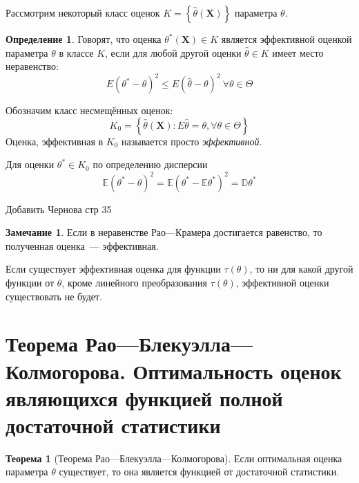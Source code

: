 \documentclass[oneside,final,14pt]{extreport}
\theoremstyle{plain}
\theoremstyle{definition}
\newtheorem*{defn}{Определение}
\newtheorem*{rmrk}{Замечание}
\theoremstyle{named}
\newtheorem*{namedthm}{Теорема}
\begin{document}
Рассмотрим некоторый класс оценок $K=\left\{\hat{\theta}\left(\mathbf{X}\right)\right\}$ параметра $\theta$.
\begin{defn}
    Говорят, что оценка $\theta^{*}\left(\mathbf{X}\right) \in K$ является эффективной оценкой параметра $\theta$ в классе $K$, если для любой другой оценки $\hat{\theta} \in K$ имеет место неравенство:
    \begin{equation*}
        E\left(\theta^{*}-\theta\right)^{2} \leqslant E(\hat{\theta}-\theta)^{2}~ \forall \theta \in \Theta
    \end{equation*}
\end{defn}
Обозначим класс несмещённых оценок:
\begin{equation*}
    K_{0}=\left\{\hat{\theta}\left(\mathbf{X}\right): E \hat{\theta}=\theta, \forall \theta \in \Theta\right\}
\end{equation*}
Оценка, эффективная в $K_0$ называется просто {\it эффективной}.

Для оценки $\theta^{*} \in K_{0}$ по определению дисперсии
\begin{equation*}
    \mathbb{E}\left(\theta^{*}-\theta\right)^{2}=\mathbb{E}\left(\theta^{*}-\mathbb{E} \theta^{*}\right)^{2}=\mathbb{D} \theta^{*}
\end{equation*}

Добавить Чернова стр 35

\begin{rmrk}
Если в неравенстве Рао---Крамера достигается равенство, то полученная оценка~--- эффективная.

Если существует эффективная оценка для функции $\tau(\theta)$, то ни для какой другой функции от $\theta$, кроме линейного преобразования $\tau(\theta)$, эффективной оценки существовать не будет. 
\end{rmrk}

\section{Теорема Рао—Блекуэлла—Колмогорова. Оптимальность оценок являющихся функцией полной достаточной статистики}

\begin{namedthm}[Теорема Рао—Блекуэлла—Колмогорова] Если оптимальная оценка параметра $\theta$ существует, то она является функцией от достаточной статистики.
\end{namedthm}
\end{document}
